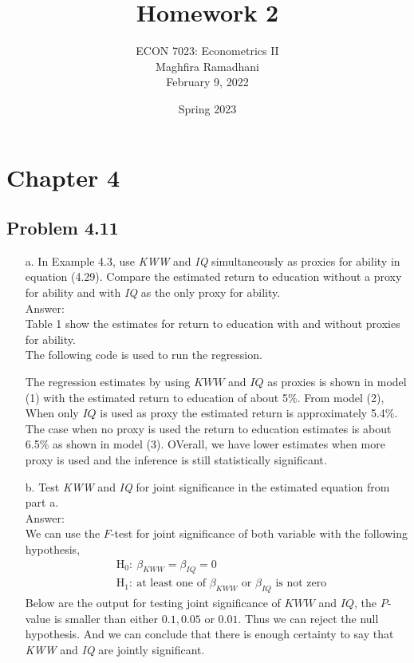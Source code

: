 \documentclass[10pt]{article}
\begin{document}
 
\title{Homework 2}
\author{ECON 7023: Econometrics II\\
Maghfira Ramadhani\\
February 9, 2022}
\date{Spring 2023}
\maketitle

\section*{Chapter 4}
\subsection*{Problem 4.11}
\begin{enumerate}
\item[a.] In Example 4.3, use \textit{KWW} and \textit{IQ} simultaneously as proxies for ability in equation (4.29). Compare the estimated return to education without a proxy for ability and with \textit{IQ} as the only proxy for ability.
\\ Answer: \\
Table 1 show the estimates for return to education with and without proxies for ability.
\\
The following code is used to run the regression.

The regression estimates by using $KWW$ and $IQ$ as proxies is shown in model (1) with the estimated return to education of about 5\%. From model (2), When only $IQ$ is used as proxy the estimated return is approximately 5.4\%. The case when no proxy is used the return to education estimates is about 6.5\% as shown in model (3). OVerall, we have lower estimates when more proxy is used and the inference is still statistically significant.

\item[b.] Test \textit{KWW} and \textit{IQ} for joint significance in the estimated equation from part a.
\\ Answer:\\
We can use the $F$-test for joint significance of both variable with the following hypothesis,
\begin{align*}
    &\text{H}_0:\ \beta_{KWW}=\beta_{IQ}=0\\
    &\text{H}_1:\ \text{at least one of }\beta_{KWW}\text{ or }\beta_{IQ} \text{ is not zero}
\end{align*}
Below are the output for testing joint significance of $KWW$ and $IQ$, the $P$-value is smaller than either $0.1, 0.05$ or $0.01$. Thus we can reject the null hypothesis. And we can conclude that there is enough certainty to say that \textit{KWW} and \textit{IQ} are jointly significant.



\end{enumerate}
\end{document}
